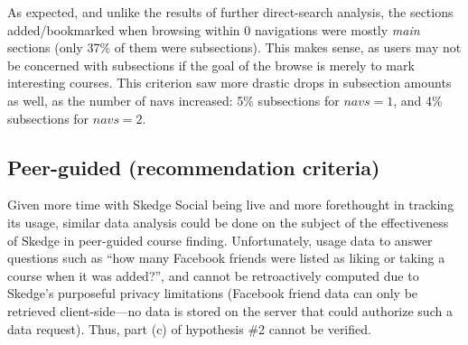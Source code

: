   As expected, and unlike the results of further direct-search analysis, the sections added/bookmarked when browsing within 0 navigations were mostly \emph{main} sections (only 37\% of them were subsections). This makes sense, as users may not be concerned with subsections if the goal of the browse is merely to mark interesting courses. This criterion saw more drastic drops in subsection amounts as well, as the number of navs increased: 5\% subsections for ${navs}=1$, and 4\% subsections for ${navs}=2$.

\subsection{Peer-guided (recommendation criteria)}

  Given more time with Skedge Social being live and more forethought in tracking its usage, similar data analysis could be done on the subject of the effectiveness of Skedge in peer-guided course finding. Unfortunately, usage data to answer questions such as ``how many Facebook friends were listed as liking or taking a course when it was added?'', and cannot be retroactively computed due to Skedge's purposeful privacy limitations (Facebook friend data can only be retrieved client-side---no data is stored on the server that could authorize such a data request). Thus, part (c) of hypothesis \#2 cannot be verified.